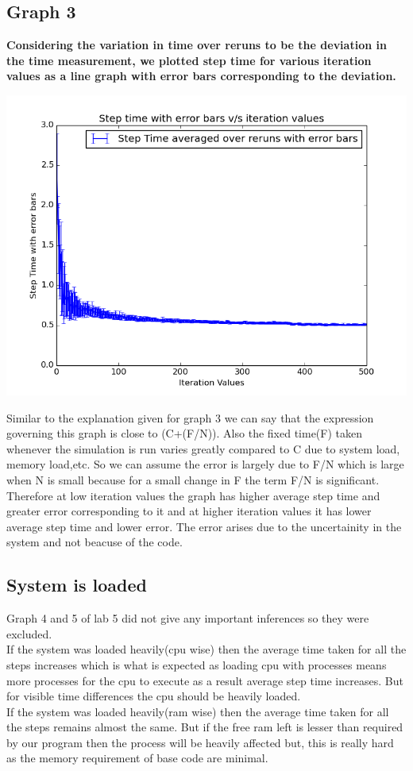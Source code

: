 \documentclass[11pt]{article}
\begin{document}
\subsection{Graph 3}
\textbf{Considering the variation in time over reruns to be the deviation in the time measurement, we plotted step time for various iteration values as a line graph with error bars corresponding to the deviation.}\\
\begin{center}
		\includegraphics[scale=0.5]{g10_project_plot03}
\end{center}
Similar to the explanation given for graph 3 we can say that the expression governing this graph is close to (C+(F/N)). Also the fixed time(F) taken whenever the simulation is run varies greatly compared to C due to system load, memory load,etc. So we can assume the error is largely due to F/N which is large when N is small because for a small change in F the term F/N is significant. Therefore at low iteration values the graph has higher average step time and greater error corresponding to it and at higher iteration values it has lower average step time and lower error. The error arises due to the uncertainity in the system and not beacuse of the code.
\subsection{System is loaded}
Graph 4 and 5 of lab 5 did not give any important inferences so they were excluded.\\
 If the system was loaded heavily(cpu wise) then the average time taken for all the steps increases which is what is expected as loading cpu with processes means more processes for the cpu to execute as a result average step time increases. But for visible time differences the cpu should be heavily loaded.\\
 If the system was loaded heavily(ram wise) then the average time taken for all the steps remains almost the same. But if the free ram left is lesser than required by our program then the process will be heavily affected but, this is really hard as the memory requirement of base code are minimal. 
\end{document}
